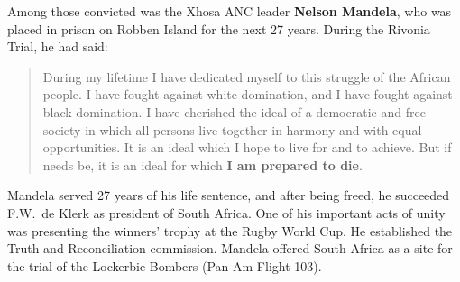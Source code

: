Among those convicted was the Xhosa ANC leader \textbf{Nelson Mandela},
who was placed in prison on Robben Island for the next 27 years.
During the Rivonia Trial, he had said:
\begin{quote}
  During my lifetime I have dedicated myself to this struggle of the African people.
  I have fought against white domination, and I have fought against black domination.
  I have cherished the ideal of a democratic and free society in which all persons live together
  in harmony and with equal opportunities.
  It is an ideal which I hope to live for and to achieve.
  But if needs be, it is an ideal for which \textbf{I am prepared to die}.
\end{quote}
Mandela served 27 years of his life sentence, and after being freed,
he succeeded F.W.\ de Klerk as president of South Africa.
One of his important acts of unity was presenting the winners' trophy at the Rugby World Cup.
He established the Truth and Reconciliation commission.
Mandela offered South Africa as a site for the trial of the Lockerbie Bombers (Pan Am Flight 103).
